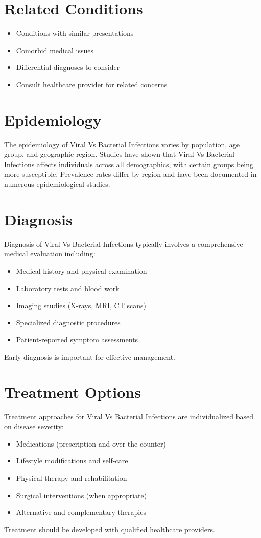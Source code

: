\section*{Related Conditions}
\begin{itemize}
  \item Conditions with similar presentations
  \item Comorbid medical issues
  \item Differential diagnoses to consider
  \item Consult healthcare provider for related concerns
\end{itemize}

\section*{Epidemiology}
The epidemiology of Viral Vs Bacterial Infections varies by population, age group, and geographic region. Studies have shown that Viral Vs Bacterial Infections affects individuals across all demographics, with certain groups being more susceptible. Prevalence rates differ by region and have been documented in numerous epidemiological studies.

\section*{Diagnosis}
Diagnosis of Viral Vs Bacterial Infections typically involves a comprehensive medical evaluation including:
\begin{itemize}
  \item Medical history and physical examination
  \item Laboratory tests and blood work
  \item Imaging studies (X-rays, MRI, CT scans)
  \item Specialized diagnostic procedures
  \item Patient-reported symptom assessments
\end{itemize}
Early diagnosis is important for effective management.

\section*{Treatment Options}
Treatment approaches for Viral Vs Bacterial Infections are individualized based on disease severity:
\begin{itemize}
  \item Medications (prescription and over-the-counter)
  \item Lifestyle modifications and self-care
  \item Physical therapy and rehabilitation
  \item Surgical interventions (when appropriate)
  \item Alternative and complementary therapies
\end{itemize}
Treatment should be developed with qualified healthcare providers.

